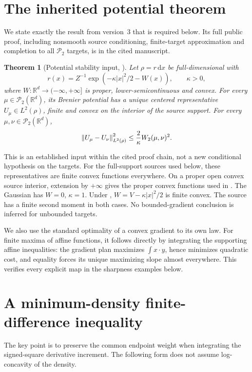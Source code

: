 \documentclass[11pt]{article}
\numberwithin{equation}{section}
\newtheorem{theorem}{Theorem}[section]
\theoremstyle{remark}\newtheorem{remark}[theorem]{Remark}
\newcommand{\R}{\mathbb R}\newcommand{\E}{\mathbb E}
\newcommand{\Prob}{\mathcal P}\newcommand{\dd}{\,\mathrm d}
\begin{document}
\section{The inherited potential theorem}\label{sec:input}
We state exactly the result from version~3 that is required below. Its full public proof, including nonsmooth source conditioning, finite-target approximation and completion to all $\Prob_2$ targets, is in the cited manuscript.

\begin{theorem}[Potential stability input, {\cite[Theorem~1.1]{ManuscriptV3}}]\label{thm:input}
Let $\rho=r\dd x$ be full-dimensional with
\[
 r(x)=Z^{-1}\exp(-\kappa|x|^2/2-W(x)),\qquad \kappa>0,
\]
where $W:\R^d\to(-\infty,+\infty]$ is proper, lower-semicontinuous and convex. For every $\mu\in\Prob_2(\R^d)$, its Brenier potential has a unique centered representative $U_\mu\in L^2(\rho)$, finite and convex on the interior of the source support. For every $\mu,\nu\in\Prob_2(\R^d)$,
\begin{equation}\label{eq:potential-input}
 \left\lVert U_\mu-U_\nu\right\rVert_{L^2(\rho)}^2
 \le\frac2\kappa W_2(\mu,\nu)^2.
\end{equation}
\end{theorem}

This is an established input within the cited proof chain, not a new conditional hypothesis on the targets. For the full-support sources used below, these representatives are finite convex functions everywhere. On a proper open convex source interior, extension by $+\infty$ gives the proper convex functions used in . The Gaussian has $W=0$, $\kappa=1$. Under , $W=V-\kappa|x|^2/2$ is finite convex. The source has a finite second moment in both cases. No bounded-gradient conclusion is inferred for unbounded targets.

We also use the standard optimality of a convex gradient to its own law. For finite maxima of affine functions, it follows directly by integrating the supporting affine inequalities: the gradient plan maximizes $\int x\cdot y$, hence minimizes quadratic cost, and equality forces its unique maximizing slope almost everywhere. This verifies every explicit map in the sharpness examples below.

\section{A minimum-density finite-difference inequality}\label{sec:minimum}
The key point is to preserve the common endpoint weight when integrating the signed-square derivative increment. The following form does not assume log-concavity of the density.
\end{document}
